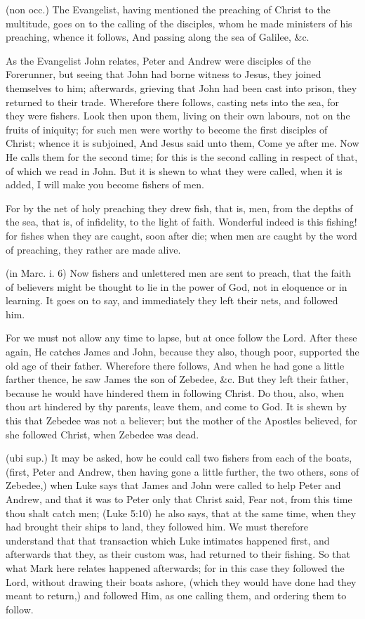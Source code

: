  (non occ.) The Evangelist, having mentioned the preaching of Christ to the multitude, goes on to the calling of the disciples, whom he made ministers of his preaching, whence it follows, And passing along the sea of Galilee, \&c.

 As the Evangelist John relates, Peter and Andrew were disciples of the Forerunner, but seeing that John had borne witness to Jesus, they joined themselves to him; afterwards, grieving that John had been cast into prison, they returned to their trade. Wherefore there follows, casting nets into the sea, for they were fishers. Look then upon them, living on their own labours, not on the fruits of iniquity; for such men were worthy to become the first disciples of Christ; whence it is subjoined, And Jesus said unto them, Come ye after me. Now He calls them for the second time; for this is the second calling in respect of that, of which we read in John. But it is shewn to what they were called, when it is added, I will make you become fishers of men.

 For by the net of holy preaching they drew fish, that is, men, from the depths of the sea, that is, of infidelity, to the light of faith. Wonderful indeed is this fishing! for fishes when they are caught, soon after die; when men are caught by the word of preaching, they rather are made alive.

 (in Marc. i. 6) Now fishers and unlettered men are sent to preach, that the faith of believers might be thought to lie in the power of God, not in eloquence or in learning. It goes on to say, and immediately they left their nets, and followed him.

 For we must not allow any time to lapse, but at once follow the Lord. After these again, He catches James and John, because they also, though poor, supported the old age of their father. Wherefore there follows, And when he had gone a little farther thence, he saw James the son of Zebedee, \&c. But they left their father, because he would have hindered them in following Christ. Do thou, also, when thou art hindered by thy parents, leave them, and come to God. It is shewn by this that Zebedee was not a believer; but the mother of the Apostles believed, for she followed Christ, when Zebedee was dead.

 (ubi sup.) It may be asked, how he could call two fishers from each of the boats, (first, Peter and Andrew, then having gone a little further, the two others, sons of Zebedee,) when Luke says that James and John were called to help Peter and Andrew, and that it was to Peter only that Christ said, Fear not, from this time thou shalt catch men; (Luke 5:10) he also says, that at the same time, when they had brought their ships to land, they followed him. We must therefore understand that that transaction which Luke intimates happened first, and afterwards that they, as their custom was, had returned to their fishing. So that what Mark here relates happened afterwards; for in this case they followed the Lord, without drawing their boats ashore, (which they would have done had they meant to return,) and followed Him, as one calling them, and ordering them to follow.

